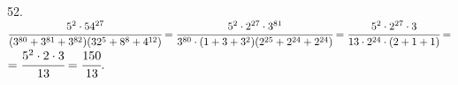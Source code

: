 52. $\cfrac{5^2\cdot54^{27}}{(3^{80}+3^{81}+3^{82})(32^5+8^8+4^{12})}=\cfrac{5^2\cdot2^{27}\cdot3^{81}}{3^{80}\cdot(1+3+3^2)(2^{25}+2^{24}+2^{24})}=
\cfrac{5^2\cdot2^{27}\cdot3}{13\cdot2^{24}\cdot(2+1+1)}=$\\$=\cfrac{5^2\cdot2\cdot3}{13}=\cfrac{150}{13}.$\\

